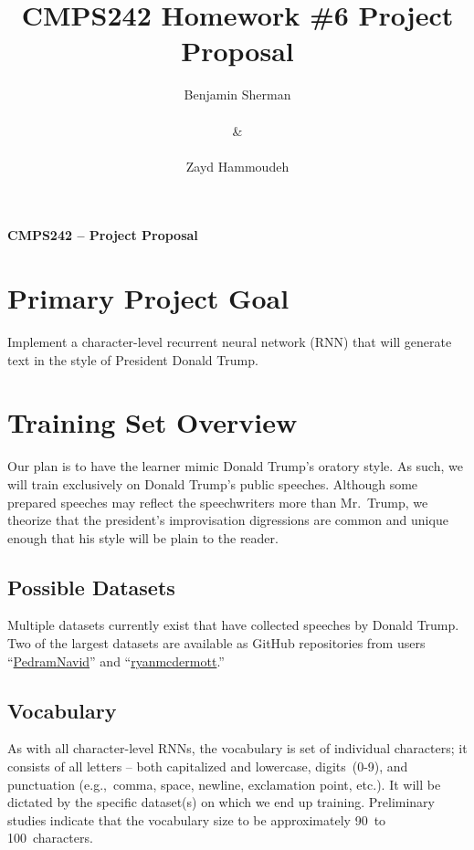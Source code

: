 \documentclass{report}
\title{\textbf{CMPS242 Homework \#6 \textendash{} Project Proposal}}
\author{Benjamin Sherman \\~\\ \& \\~\\ Zayd Hammoudeh}
\date{} %
\begin{document}
  \maketitle
  
  \begin{center}
    {\Large \textbf{CMPS242 -- Project Proposal}} \\[.125in]
  \end{center}
  
  \suppressfloats %
  \section{Primary Project Goal}
  
  Implement a character-level recurrent neural network (RNN) that will generate text in the style of President Donald Trump.
  
  \section{Training Set Overview}
  
  Our plan is to have the learner mimic Donald Trump's oratory style.  As such, we will train exclusively on Donald Trump's public speeches. Although some prepared speeches may reflect the speechwriters more than Mr.~Trump, we theorize that the president's improvisation digressions are common and unique enough that his style will be plain to the reader.
  
  \subsection{Possible Datasets}
  
  Multiple datasets currently exist that have collected speeches by Donald Trump.  Two of the largest datasets are available as GitHub repositories from users ``\href{https://github.com/PedramNavid/trump_speeches}{PedramNavid}'' and ``\href{https://github.com/ryanmcdermott/trump-speeches}{ryanmcdermott}.''
  
  \subsection{Vocabulary}\label{sec:vocabulary}
  
  As with all character-level RNNs, the vocabulary is set of individual characters; it consists of all letters -- both capitalized and lowercase, digits~(0-9), and punctuation (e.g.,~comma, space, newline, exclamation point, etc.).  It will be dictated by the specific dataset(s) on which we end up training.  Preliminary studies indicate that the vocabulary size to be approximately 90~to 100~characters.
   
\end{document}
